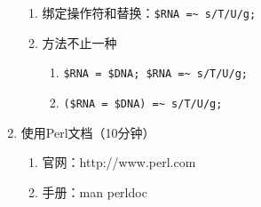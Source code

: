 \documentclass{TIJMUjiaoanLL}
\begin{document}
\begin{enumerate}
\begin{enumerate}
      \item 绑定操作符和替换：\verb|$RNA =~ s/T/U/g;|
      \item 方法不止一种
	\begin{enumerate}
	  \item \verb|$RNA = $DNA; $RNA =~ s/T/U/g;|
	  \item \verb|($RNA = $DNA) =~ s/T/U/g;|
	\end{enumerate}
    \end{enumerate}
  \item 使用Perl文档（10分钟）
\vspace*{-1em}
\begin{multicols}{2}
    \begin{enumerate}
      \item 官网：http://www.perl.com
      \item 手册：man perldoc
    \end{enumerate}
\end{multicols}
\vspace*{-1em}

\otherTail
\newpage
\otherHeader


\end{enumerate}
\end{document}
